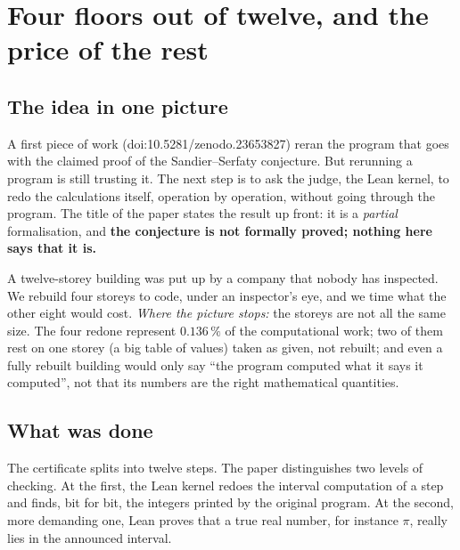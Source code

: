 \chapter[Four floors out of twelve]{Four floors out of twelve, and the price of the rest}


\section*{The idea in one picture}

A first piece of work (doi:10.5281/\allowbreak zenodo.23653827) reran the program that goes with
the claimed proof of the Sandier--Serfaty conjecture. But rerunning a program is still trusting
it. The next step is to ask the judge, the Lean kernel, to redo the calculations itself,
operation by operation, without going through the program. The title of the paper states the
result up front: it is a \emph{partial} formalisation, and \textbf{the conjecture is not
formally proved; nothing here says that it is.}

\begin{analogie}
A twelve-storey building was put up by a company that nobody has inspected. We rebuild four
storeys to code, under an inspector's eye, and we time what the other eight would cost.
\emph{Where the picture stops:} the storeys are not all the same size. The four redone represent
$0.136\,\%$ of the computational work; two of them rest on one storey (a big table of values)
taken as given, not rebuilt; and even a fully rebuilt building would only say ``the program
computed what it says it computed'', not that its numbers are the right mathematical quantities.
\end{analogie}

\section*{What was done}

The certificate splits into twelve steps. The paper distinguishes two levels of checking. At the
first, the Lean kernel redoes the interval computation of a step and finds, bit for bit, the
integers printed by the original program. At the second, more demanding one, Lean proves that a
true real number, for instance $\pi$, really lies in the announced interval.

